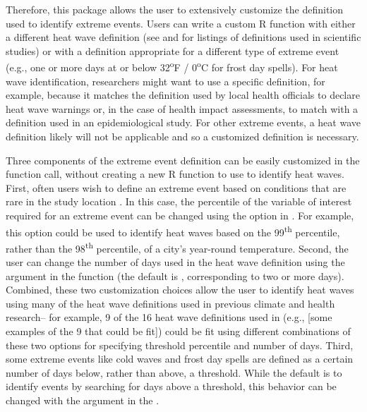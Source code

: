 Therefore, this package allows the user to extensively customize the
definition used to identify extreme events. Users can write a custom R
function with either a different heat wave definition (see
\citet{smith2013heat} and \citet{kent2014heat} for listings of
definitions used in scientific studies) or with a definition appropriate
for a different type of extreme event (e.g., one or more days at or
below 32\textsuperscript{o}F / 0\textsuperscript{o}C for frost day
spells). For heat wave identification, researchers might want to use a
specific definition, for example, because it matches the definition used
by local health officials to declare heat wave warnings or, in the case
of health impact assessments, to match with a definition used in an
epidemiological study. For other extreme events, a heat wave definition
likely will not be applicable and so a customized definition is
necessary.

Three components of the extreme event definition can be easily
customized in the  function call, without creating a
new R function to use to identify heat waves. First, often users wish to
define an extreme event based on conditions that are rare in the study
location \citep{IPCCch1}. In this case, the percentile of the variable
of interest required for an extreme event can be changed using the
 option in . For example, this
option could be used to identify heat waves based on the
99\textsuperscript{th} percentile, rather than the
98\textsuperscript{th} percentile, of a city's year-round temperature.
Second, the user can change the number of days used in the heat wave
definition using the  argument in the 
function (the default is , corresponding to two or
more days). Combined, these two customization choices allow the user to
identify heat waves using many of the heat wave definitions used in
previous climate and health research-- for example, 9 of the 16 heat
wave definitions used in \citet{kent2014heat} (e.g., {[}some examples of
the 9 that could be fit{]}) could be fit using different combinations of
these two options for specifying threshold percentile and number of
days. Third, some extreme events like cold waves and frost day spells
are defined as a certain number of days below, rather than above, a
threshold. While the default is to identify events by searching for days
above a threshold, this behavior can be changed with the
 argument in the
.

